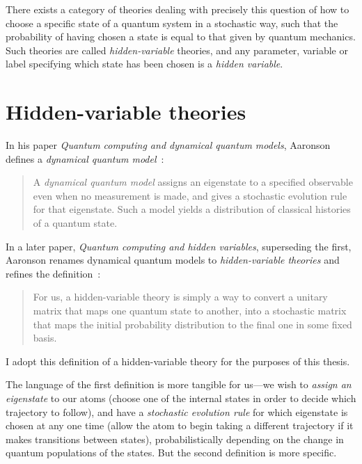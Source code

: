 There exists a category of theories dealing with precisely this question of how to choose a specific state of a quantum system in a stochastic way, such that the probability of having chosen a state is equal to that given by quantum mechanics. Such theories are called \emph{hidden-variable} theories, and any parameter, variable or label specifying which state has been chosen is a \emph{hidden variable}.

\section{Hidden-variable theories}\label{sec:hidden_variable_theories}

In his paper \emph{Quantum computing and dynamical quantum models}, Aaronson defines a \emph{dynamical quantum model}~\cite{aaronson_quantum_2002}:

\begin{quote}
A \emph{dynamical quantum model} assigns an eigenstate to a specified observable even when no measurement is made, and gives a stochastic evolution rule for that eigenstate. Such a model yields a distribution of classical histories of a quantum state.
\end{quote}
In a later paper, \emph{Quantum computing and hidden variables}, superseding the first, Aaronson renames dynamical quantum models to \emph{hidden-variable theories} and refines the definition~\cite{PhysRevA.71.032325}:
\begin{quote}
For us, a hidden-variable theory is simply a way to convert a unitary matrix that maps one quantum state to another, into a stochastic matrix that maps the initial probability distribution to the final one in some fixed basis.
\end{quote}
I adopt this definition of a hidden-variable theory for the purposes of this thesis.

The language of the first definition is more tangible for us---we wish to \emph{assign an eigenstate} to our atoms (choose one of the internal states in order to decide which trajectory to follow), and have a \emph{stochastic evolution rule} for which eigenstate is chosen at any one time (allow the atom to begin taking a different trajectory if it makes transitions between states), probabilistically depending on the change in quantum populations of the states. But the second definition is more specific.

